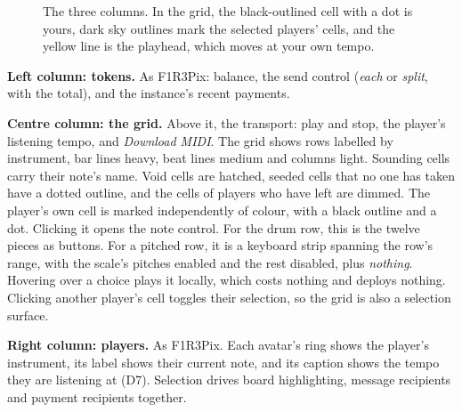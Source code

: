 \documentclass[11pt,a4paper]{article}
\begin{document}
\begin{figure}[h]
\caption{The three columns. In the grid, the black-outlined cell with a dot is yours, dark sky
outlines mark the selected players' cells, and the yellow line is the playhead, which moves at
your own tempo.}
\label{fig:layout}
\end{figure}

\textbf{Left column: tokens.} As F1R3Pix: balance, the send control (\emph{each} or
\emph{split}, with the total), and the instance's recent payments.

\textbf{Centre column: the grid.} Above it, the transport: play and stop, the player's
listening tempo, and \emph{Download MIDI}. The grid shows rows labelled by instrument, bar lines
heavy, beat lines medium and columns light. Sounding cells carry their note's name. Void cells are hatched, seeded cells that no one has
taken have a dotted outline, and the cells of players who have left are dimmed. The player's
own cell is marked independently of colour, with a black outline and a dot. Clicking it opens
the note control. For the drum row, this is the twelve pieces as buttons. For a pitched row, it
is a keyboard strip spanning the row's range, with the scale's pitches enabled and the rest
disabled, plus \emph{nothing}. Hovering over a choice plays it
locally, which costs nothing and deploys nothing. Clicking another player's cell toggles their
selection, so the grid is also a selection surface.

\textbf{Right column: players.} As F1R3Pix. Each avatar's ring shows the player's instrument,
its label shows their current note, and its caption shows the tempo they are listening at (D7).
Selection drives board highlighting, message recipients and payment recipients together.
\end{document}
